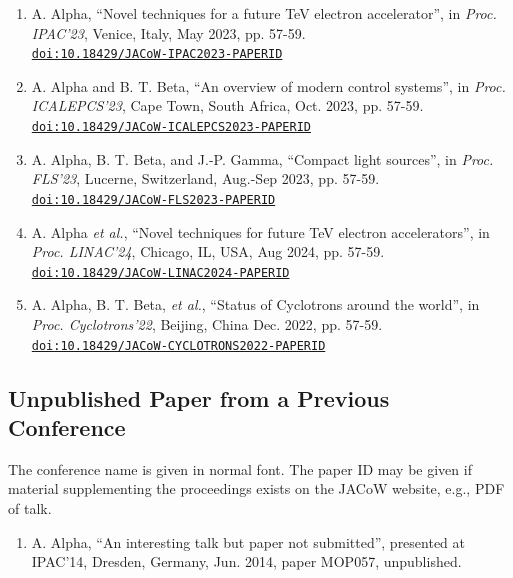 \documentclass[%
               hyphens,       %
               ]{jacow}
\begin{document}
\begin{enumerate}\small
	\item A. Alpha, “Novel techniques for a future TeV electron accelerator”, 
		in \textit{Proc. IPAC’23}, Venice, Italy, May 2023, pp. 57-59. \\ \href{https//doi.org/10.18429/JACoW-IPAC2023}{\texttt{{doi:10.18429/JACoW-IPAC2023-PAPERID}}}

	\item A. Alpha and B. T. Beta, “An overview of modern control systems”, 
		in \textit{Proc. ICALEPCS’23}, Cape Town, South Africa, Oct. 2023, pp. 57-59. \\ \href{https//doi.org/10.18429/JACoW.ICALEPCS2023}{\texttt{doi:10.18429/JACoW-ICALEPCS2023-PAPERID}}

	\item A. Alpha, B. T. Beta, and J.-P. Gamma, “Compact light sources”, 
		in \textit{ Proc. FLS’23}, Lucerne, Switzerland, Aug.-Sep 2023, pp. 57-59. \\ \href{https//doi.org/10.18429/JACoW-FLS2023}{\texttt{doi:10.18429/JACoW-FLS2023-PAPERID}}

	\item A. Alpha \textit{et al.}, “Novel techniques for future TeV electron accelerators”, 
		in \textit{Proc. LINAC’24}, Chicago, IL, USA, Aug 2024, pp. 57-59. \\
		\href{https//doi.org/10.18429/JACoW-LINAC2024}{\texttt{doi:10.18429/JACoW-LINAC2024-PAPERID}}

	\item A. Alpha, B. T. Beta, \textit{et al.}, “Status of Cyclotrons around the world”, 
		in \textit{Proc. Cyclotrons’22}, Beijing, China Dec. 2022, pp. 57-59. \\
		\href{https//doi.org/10.18429/JACoW-CYCLOTRONS2022}{\texttt{doi:10.18429/JACoW-CYCLOTRONS2022-PAPERID}}
\end{enumerate}

\subsection{Unpublished Paper from a Previous Conference}

The conference name is given in normal font. The paper ID may be given if material supplementing the proceedings exists on the JACoW website, e.g., PDF of talk.
\begin{enumerate}[resume*]\small
	\item A. Alpha, “An interesting talk but paper not submitted”, presented at IPAC’14, Dresden, Germany, Jun. 2014, paper MOP057, unpublished. 
\end{enumerate}
\end{document}
